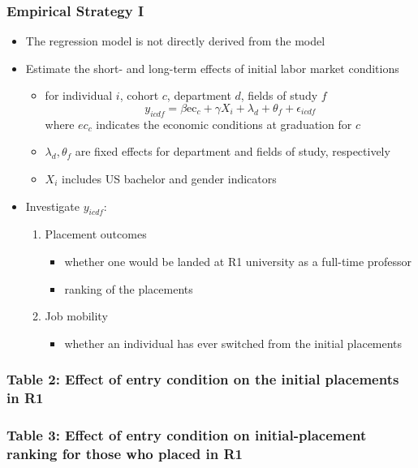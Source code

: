 \documentclass[10pt,svgnames,fragile]{beamer}
\begin{document}
{\begin{frame}
	\frametitle{Empirical Strategy I}
	\begin{itemize}
		\item The regression model is not directly derived from the  model
		\vfill
		\item Estimate the short- and long-term effects of initial labor market conditions 
			\begin{itemize}
				\item for individual $i$, cohort $c$, department $d$, fields of study $f$
				\begin{equation}
					y_{icdf} = \beta \text{ec}_{c}+\gamma X_{i}+\lambda_{d}+\theta_f  +\epsilon_{icdf}
				\end{equation}
				where $ec_c$ indicates the economic conditions at graduation for $c$
				\item $\lambda_{d},\theta_f $ are fixed effects for department and fields of study, respectively
				\item $X_i$ includes US bachelor and gender indicators
	\end{itemize}
	\vfill
			\item Investigate $y_{icdf}$:
			\begin{enumerate}
				\item Placement outcomes
				\begin{itemize}
					\item whether one would be landed at R1 university as a full-time professor
					\item ranking of the placements
				\end{itemize}
				\item Job mobility
				\begin{itemize}
				\item whether an individual has ever switched from the initial placements
				\end{itemize}
	\vfill
			\end{enumerate}
\end{itemize}
\end{frame}




{
\begin{frame}
	\frametitle{Table 2: Effect of entry condition on the initial placements in R1}
	
\end{frame}}

{
\begin{frame}
	\frametitle{Table 3: Effect of entry condition on  initial-placement ranking   for those who placed in R1}
	
\end{frame}}

}
\end{document}
